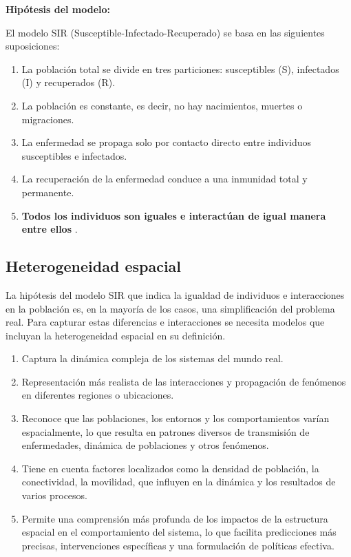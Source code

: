 \documentclass[fleqn,10pt]{SelfArx_063318} %
\begin{document}
\textbf{Hipótesis del modelo:}

El modelo SIR (Susceptible-Infectado-Recuperado) se basa en las siguientes suposiciones:
\begin{enumerate}
    \item La población total se divide en tres particiones: susceptibles (S), infectados (I) y recuperados (R).
    \item La población es constante, es decir, no hay nacimientos, muertes o migraciones.
    \item La enfermedad se propaga solo por contacto directo entre individuos susceptibles e infectados.
    \item La recuperación de la enfermedad conduce a una inmunidad total y permanente.
    \item \textbf{Todos los individuos son iguales e interactúan de igual manera entre ellos} \cite{ball2015seven}.
\end{enumerate}

\subsection{Heterogeneidad espacial}

La hipótesis del modelo SIR que indica la igualdad de individuos e interacciones en la población es, en la mayoría de
los casos, una simplificación del problema real. Para capturar estas diferencias e interacciones se necesita modelos
que incluyan la heterogeneidad espacial en su definición.

\begin{enumerate}
    \item Captura la dinámica compleja de los sistemas del mundo real.
    \item Representación más realista de las interacciones y 
    propagación de fenómenos en diferentes regiones o ubicaciones.
    \item Reconoce que las poblaciones, los entornos y los comportamientos varían espacialmente, lo que resulta en 
    patrones diversos de transmisión de enfermedades, dinámica de poblaciones y otros fenómenos.
    \item Tiene en cuenta factores localizados como la densidad de población, la conectividad, la movilidad, 
    que influyen en la dinámica y los resultados de varios procesos.
    \item Permite una comprensión más profunda de los impactos de la estructura espacial en el comportamiento 
    del sistema, lo que facilita predicciones más precisas, intervenciones específicas y una formulación de 
    políticas efectiva.
\end{enumerate}
\end{document}
